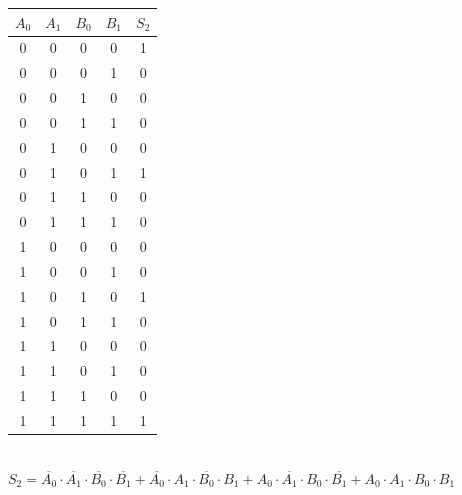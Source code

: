 \begin{center}
\begin{tabular}{cccc|c}
\rowcolor[HTML]{FFCCC9} 
\textbf{$A_0$} & \textbf{$A_1$} & \textbf{$B_0$} & \textbf{$B_1$} & \cellcolor[HTML]{ECF4FF}\textbf{$S_2$} \\ \hline
0              & 0              & 0              & 0              & 1                                      \\
0              & 0              & 0              & 1              & 0                                      \\
0              & 0              & 1              & 0              & 0                                      \\
0              & 0              & 1              & 1              & 0                                      \\
0              & 1              & 0              & 0              & 0                                      \\
0              & 1              & 0              & 1              & 1                                      \\
0              & 1              & 1              & 0              & 0                                      \\
0              & 1              & 1              & 1              & 0                                      \\
1              & 0              & 0              & 0              & 0                                      \\
1              & 0              & 0              & 1              & 0                                      \\
1              & 0              & 1              & 0              & 1                                      \\
1              & 0              & 1              & 1              & 0                                      \\
1              & 1              & 0              & 0              & 0                                      \\
1              & 1              & 0              & 1              & 0                                      \\
1              & 1              & 1              & 0              & 0                                      \\
1              & 1              & 1              & 1              & 1                                     
\end{tabular}\\[10pt]
$S_2 = \overline{A_0}\cdot\overline{A_1}\cdot\overline{B_0}\cdot\overline{B_1} + \overline{A_0}\cdot{}A_1\cdot{}\overline{B_0}\cdot{}B_1+A_0\cdot{}\overline{A_1}\cdot{}B_0\cdot\overline{B_1}+A_0\cdot{}A_1\cdot{}B_0\cdot{}B_1$
\end{center}
